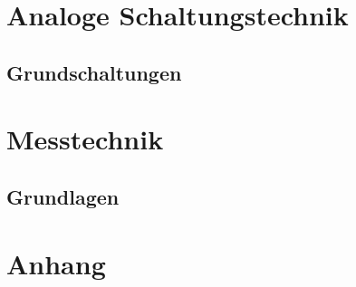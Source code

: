 \documentclass[a5paper]{report}
\begin{document}
	\part{Analoge Schaltungstechnik}
	
		\chapter{Grundschaltungen}
		
		
	\part{Messtechnik}
	
		\chapter{Grundlagen}
		

%
%
\renewcommand{\indexname}{Sachregister}
\part{Anhang}
\printindex
\end{document}
